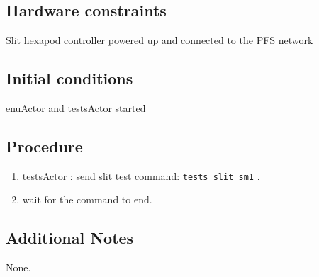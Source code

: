 \subsection{Hardware constraints}

Slit hexapod controller powered up and connected to the PFS network

\subsection{Initial conditions}
enuActor and testsActor started

\subsection{Procedure}

\begin{enumerate}
    \item testsActor : send slit test command: \texttt{tests slit sm1} .
    \item wait for the command to end.
\end{enumerate}



\subsection{Additional Notes}

None.